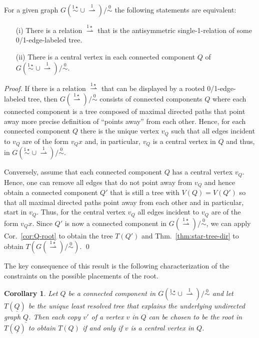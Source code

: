 \documentclass[smallextended]{svjour3}
\newcommand{\TODO}[1]{\begingroup\color{red}#1\endgroup}
\newcommand{\Ro}{\mathrel{\overset{0}{\sim}}}
\newcommand{\Rlstar}{\mathrel{\overset{1\star}{\sim}}}
\newcommand{\Rldstar}{\mathrel{\overset{1\star}{\rightharpoonup}}}
\newcommand{\Rld}{\mathrel{\overset{1}{\rightharpoonup}}}
\newtheorem{cor}[thm]{Corollary}
\begin{document}
\begin{lemma}
  For a given graph $G(\Rlstar\cup\Rld)/\Ro$ the following statements
  are equivalent:
  \begin{itemize}
  \item[(i)] There is a relation $\Rldstar$ that is the antisymmetric
    single-1-relation of some 0/1-edge-labeled tree.
  \item[(ii)] There is a central vertex in each connected component $Q$ of
    $G(\Rlstar\cup\Rld)/\Ro$.
  \end{itemize}
\end{lemma}
\begin{proof}
  If there is a relation $\Rldstar$ that can be displayed by a rooted
  0/1-edge-labeled tree, then $G(\Rldstar)/\Ro$ consists of connected
  components $Q$ where each connected component is a tree composed of
  maximal directed paths that point away \TODO{more precise definition of
    ``points away''} from each other. Hence, for each connected component
  $Q$ there is the unique vertex $v_Q$ such that all edges incident to
  $v_Q$ are of the form $v_Qx$ and, in particular, $v_Q$ is a central
  vertex in $Q$ and thus, in $G(\Rlstar\cup\Rld)/\Ro$.

  Conversely, assume that each connected component $Q$ has a central
  vertex $v_Q$. Hence, one can remove all edges that do not point away from
  $v_Q$ and hence obtain a connected component $Q'$ that is still a tree
  with $V(Q)=V(Q')$ so that all maximal directed paths point away from each
  other and in particular, start in $v_Q$.  Thus, for the central vertex
  $v_Q$ all edges incident to $v_Q$ are of the form $v_Qx$. Since $Q'$ is
  now a connected component in $G(\Rldstar)/\Ro$, we can apply Cor.\
  \ref{cor:Q-root} to obtain the tree $T(Q')$ and
  Thm.\ \ref{thm:star-tree-dir} to obtain $T(G(\Rldstar)/\Ro)$. \qed
\end{proof}

The key consequence of this result is the following characterization of the
constraints on the possible placements of the root.

\begin{cor}
  Let $Q$ be a connected component in $G(\Rlstar\cup\Rld)/\Ro$ and let
  $T(\underline{Q})$ be the unique least resolved tree that explains the
  underlying undirected graph $\underline{Q}$.  Then each copy $v'$ of a
  vertex $v$ in $Q$ can be chosen to be the root in $T(\underline{Q})$ to
  obtain $T(Q)$ if and only if $v$ is a central vertex in $Q$.
\end{cor}
\end{document}

